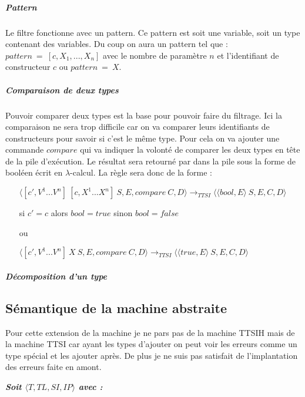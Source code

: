 \documentclass[10pt,a4paper]{report}
\begin{document}
	
	\subparagraph{Pattern } Le filtre fonctionne avec un pattern. Ce pattern est soit une variable, soit un type contenant des variables. Du coup on aura un pattern tel que : $pattern~=~[c,X_{1},...,X_{n}]$ avec le nombre de paramètre $n$ et l'identifiant de constructeur $c$ ou $pattern~=~X$.
	
	\subparagraph{Comparaison de deux types } Pouvoir comparer deux types est la base pour pouvoir faire du filtrage. Ici la comparaison ne sera trop difficile car on va comparer leurs identifiants de constructeurs pour savoir si c'est le même type. Pour cela on va ajouter une commande $compare$ qui va indiquer la volonté de comparer les deux types en tête de la pile d'exécution. Le résultat sera retourné par dans la pile sous la forme de booléen écrit en $\lambda$-calcul. La règle sera donc de la forme :
	\smallbreak
	\begin{enumerate}
		\item[] $\langle [c',V^{1}...V^{n}]~[c,X^{1}...X^{n}]~S,E,compare~C,D\rangle
		\longrightarrow_{TTSI} 
		\langle \langle bool,E\rangle~S,E,C,D\rangle$ 
		\item[] si $c'=c$ alors $bool = true$ sinon $bool = false$ 
		\item[ou]
		\item[] $\langle [c',V^{1}...V^{n}]~X~S,E,compare~C,D\rangle
		\longrightarrow_{TTSI} 
		\langle \langle true,E\rangle~S,E,C,D\rangle$ 
	\end{enumerate}

	\subparagraph{Décomposition d'un type } 
	
	\subsection{Sémantique de la machine abstraite}
	
	Pour cette extension de la machine je ne pars pas de la machine TTSIH mais de la machine TTSI car ayant les types d'ajouter on peut voir les erreurs comme un type spécial et les ajouter après. De plus je ne suis pas satisfait de l'implantation des erreurs faite en amont.
	\bigbreak
	
	
	\textbf{\textit{Soit $\langle T,TL,SI,IP\rangle$ avec :}}
	
\end{document}
